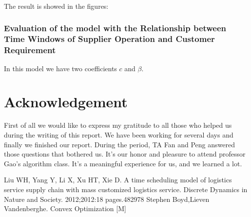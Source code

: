 \documentclass[12pt,a4paper]{article}
\begin{document}
The result is showed in the figures:\\

\subsubsection{Evaluation of the model with the Relationship between Time Windows of Supplier Operation and Customer Requirement}
In this model we have two coefficients $c$ and $\beta$.

\section*{Acknowledgement}
First of all we would like to express my gratitude to all those who helped us during the writing of this report. We have been working for several days and finally we finished our report. During the period, TA Fan and Peng answered those questions that bothered us. It's our honor and pleasure to attend professor Gao's algorithm class. It's a meaningful experience for us, and we learned a lot.

\begin{thebibliography}{1}
  Liu WH, Yang Y, Li X, Xu HT, Xie D. A time scheduling model of logistics service supply chain with mass customized logistics service. Discrete Dynamics in Nature and Society. 2012;2012:18 pages.482978
 Stephen Boyd,Lieven Vandenberghe. Convex Optimization [M]
\end{thebibliography}
\
\end{document}
